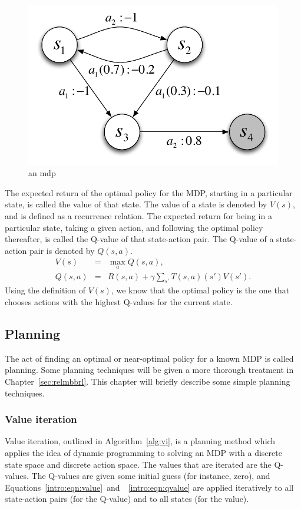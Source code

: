 \begin{figure}[t]
\begin{center}
\includegraphics[width=0.5\linewidth]{mdp.pdf}
\caption{an mdp}
\label{intro:mdp}
\end{center}
\end{figure}



The expected return of the optimal policy for the MDP, starting in a particular state, is called the value of that state. The value of a state is denoted by $V(s)$, and is defined as a recurrence relation. The expected return for being in a particular state, taking a given action, and following the optimal policy thereafter, is called the Q-value of that state-action pair. The Q-value of a state-action pair is denoted by $Q(s,a)$.
\begin{eqnarray}
\label{intro:eqn:value} V(s) &=& \max_a Q(s,a),\\
\label{intro:eqn:qvalue} Q(s,a) &=& R(s,a) + \gamma \sum_{s'} T(s,a)(s') V(s').
\end{eqnarray}
Using the definition of $V(s)$, we know that the optimal policy is the one that chooses actions with the highest Q-values for the current state.

\subsection{Planning}

The act of finding an optimal or near-optimal policy for a known MDP is called planning. Some planning techniques will be given a more thorough treatment in Chapter~\ref{sec:relmbbrl}. This chapter will briefly describe some simple planning techniques.

\subsubsection{Value iteration}

Value iteration, outlined in Algorithm~\ref{alg:vi}, is a planning method which applies the idea of dynamic programming to solving an MDP with a discrete state space and discrete action space. The values that are iterated are the Q-values. The Q-values are given some initial guess (for instance, zero), and Equations~\ref{intro:eqn:value}~and~~\ref{intro:eqn:qvalue} are applied iteratively to all state-action pairs (for the Q-value) and to all states (for the value).

